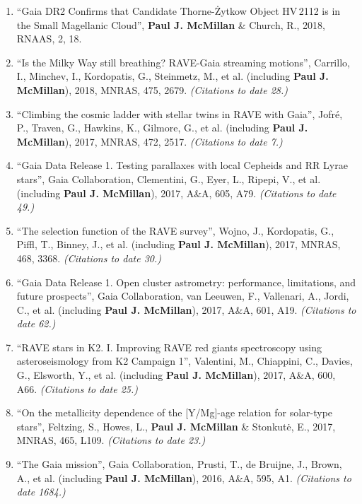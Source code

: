 \documentclass{resume}
\begin{document}
\begin{enumerate}
\item ``Gaia DR2 Confirms that Candidate Thorne-\.Zytkow Object HV\,2112 is in the Small Magellanic Cloud'', \textbf{Paul J. McMillan} \& Church, R., 2018, RNAAS, 2, 18.

\item ``Is the Milky Way still breathing? RAVE-Gaia streaming motions'', Carrillo, I., Minchev, I., Kordopatis, G., Steinmetz, M., et al. (including \textbf{Paul J. McMillan}), 2018, MNRAS, 475, 2679. \textit{(Citations to date 28.)}

\item ``Climbing the cosmic ladder with stellar twins in RAVE with Gaia'', Jofr\'e, P., Traven, G., Hawkins, K., Gilmore, G., et al. (including \textbf{Paul J. McMillan}), 2017, MNRAS, 472, 2517. \textit{(Citations to date 7.)}

\item ``Gaia Data Release 1. Testing parallaxes with local Cepheids and RR Lyrae stars'', Gaia Collaboration, Clementini, G., Eyer, L., Ripepi, V., et al. (including \textbf{Paul J. McMillan}), 2017, A\&A, 605, A79. \textit{(Citations to date 49.)}

\item ``The selection function of the RAVE survey'', Wojno, J., Kordopatis, G., Piffl, T., Binney, J., et al. (including \textbf{Paul J. McMillan}), 2017, MNRAS, 468, 3368. \textit{(Citations to date 30.)}

\item ``Gaia Data Release 1. Open cluster astrometry: performance, limitations, and future prospects'', Gaia Collaboration, van Leeuwen, F., Vallenari, A., Jordi, C., et al. (including \textbf{Paul J. McMillan}), 2017, A\&A, 601, A19. \textit{(Citations to date 62.)}

\item ``RAVE stars in K2. I. Improving RAVE red giants spectroscopy using asteroseismology from K2 Campaign 1'', Valentini, M., Chiappini, C., Davies, G., Elsworth, Y., et al. (including \textbf{Paul J. McMillan}), 2017, A\&A, 600, A66. \textit{(Citations to date 25.)}

\item ``On the metallicity dependence of the [Y/Mg]-age relation for solar-type stars'', Feltzing, S., Howes, L., \textbf{Paul J. McMillan} \& Stonkut\.{e}, E., 2017, MNRAS, 465, L109. \textit{(Citations to date 23.)}

\item ``The Gaia mission'', Gaia Collaboration, Prusti, T., de Bruijne, J., Brown, A., et al. (including \textbf{Paul J. McMillan}), 2016, A\&A, 595, A1. \textit{(Citations to date 1684.)}


\end{enumerate}
\end{document}
